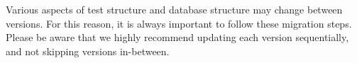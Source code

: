 Various aspects of test structure and database structure may change between versions. For this reason, it is always important to follow these migration steps. 
Please be aware that we highly recommend updating each version sequentially, and not skipping versions in-between. 
